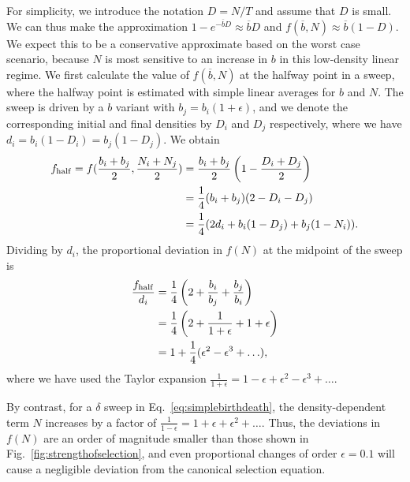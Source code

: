 \documentclass[11pt]{article}
\begin{document}
For simplicity, we introduce the notation $D=N/T$ and assume that $D$ is small. We can thus make the approximation $1-e^{-\overline{b}D}\approx \overline{b}D$ and $f(\overline{b},N)\approx \overline{b}(1-D)$. We expect this to be a conservative approximate based on the worst case scenario, because $N$ is most sensitive to an increase in $b$ in this low-density linear regime. We first calculate the value of $f(\overline{b},N)$ at the halfway point in a sweep, where the halfway point is estimated with simple linear averages for $b$ and $N$. The sweep is driven by a $b$ variant with $b_j=b_i(1+\epsilon)$, and we denote the corresponding initial and final densities by $D_i$ and $D_j$ respectively, where we have $d_i=b_i(1-D_i)=b_j(1-D_j)$. We obtain
\begin{align}
f_{\rm{half}}=f(\frac{b_i+b_j}{2},\frac{N_i+N_j}{2})&=\frac{b_i+b_j}{2}\left(1-\frac{D_i+D_j}{2}\right) \nonumber \\
&=\frac{1}{4} (b_i+b_j)(2-D_i-D_j) \nonumber \\
&=\frac{1}{4} (2d_i+b_i(1-D_j)+b_j(1-N_i)).
\end{align}
Dividing by $d_i$, the proportional deviation in $f(N)$ at the midpoint of the sweep is
\begin{align}
\frac{f_{\rm{half}}}{d_i}&=\frac{1}{4}\left(2+\frac{b_i}{b_j}+\frac{b_j}{b_i}\right)\nonumber \\
&=\frac{1}{4}\left(2+\frac{1}{1+\epsilon}+1+\epsilon\right)\nonumber \\
&=1+\frac{1}{4}(\epsilon^2-\epsilon^3+\ldots),
\end{align}
where we have used the Taylor expansion $\frac{1}{1+\epsilon}=1-\epsilon+\epsilon^2-\epsilon^3+\ldots$. 

By contrast, for a $\delta$ sweep in Eq.~\eqref{eq:simplebirthdeath}, the density-dependent term $N$ increases by a factor of $\frac{1}{1-\epsilon}=1+\epsilon+\epsilon^2+\ldots$. Thus,  the deviations in $f(N)$ are an order of magnitude smaller than those shown in Fig.~\eqref{fig:strengthofselection}, and even proportional changes of order $\epsilon=0.1$ will cause a negligible deviation from the canonical selection equation.
\end{document}
